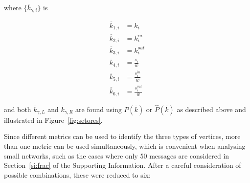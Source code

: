 \documentclass[%
aip,
jmp,%
amsmath,amssymb,
reprint,%
]{revtex4-1}
\begin{document}
\noindent where $\{\overline{k}_{\gamma,i}\}$ is

\begin{equation}
\begin{split}
\overline{k}_{1,i}&=k_i \\
\overline{k}_{2,i}&=k_i^{in} \\
\overline{k}_{3,i}&=k_i^{out} \\
\overline{k}_{4,i}&=\frac{s_i}{\overline{w}} \\
\overline{k}_{5,i}&=\frac{s_i^{in}}{\overline{w}} \\
\overline{k}_{6,i}&=\frac{s_i^{out}}{\overline{w}}
\end{split}
\end{equation}

\noindent and both $\overline{k}_{\gamma,L}$ and $\overline{k}_{\gamma,R}$ are found using $P(\overline{k})$ or $\hat{P}(\overline{k})$ as described above and illustrated in Figure~\ref{fig:setores}.

Since different metrics can be used to identify the three types of vertices, more than one metric can be used simultaneously, which is convenient when analysing small networks,
such as the cases where only 50 messages are considered in Section~\ref*{si:frac} of the Supporting Information.
After a careful consideration of possible combinations, these were reduced to six:
\end{document}
